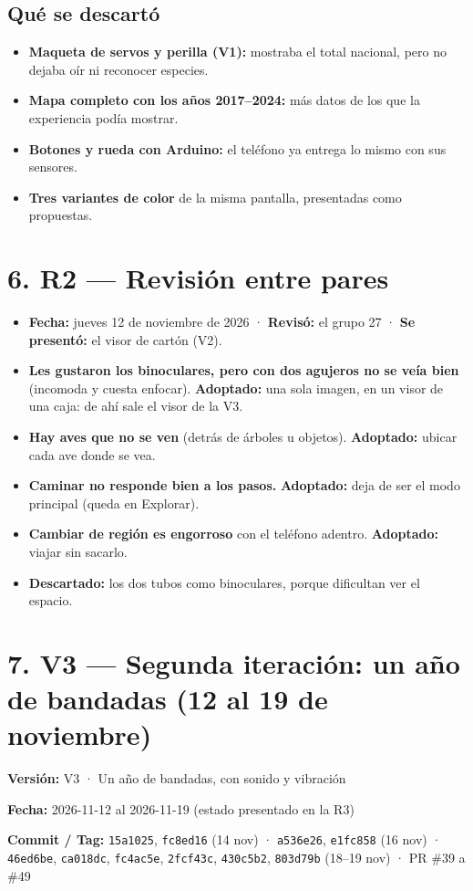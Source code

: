 \documentclass[11pt,a4paper]{article}
\newcommand{\seccion}[1]{\clearpage\section*{#1}}
\begin{document}
\subsection*{Qué se descartó}
\begin{itemize}
\item \textbf{Maqueta de servos y perilla (V1):} mostraba el total nacional, pero no dejaba oír ni reconocer especies.
\item \textbf{Mapa completo con los años 2017--2024:} más datos de los que la experiencia podía mostrar.
\item \textbf{Botones y rueda con Arduino:} el teléfono ya entrega lo mismo con sus sensores.
\item \textbf{Tres variantes de color} de la misma pantalla, presentadas como propuestas.
\end{itemize}
\section*{6. R2 --- Revisión entre pares}
\begin{itemize}
\item \textbf{Fecha:} jueves 12 de noviembre de 2026 · \textbf{Revisó:} el grupo 27 · \textbf{Se presentó:} el visor de cartón (V2).
\item \textbf{Les gustaron los binoculares, pero con dos agujeros no se veía bien} (incomoda y cuesta enfocar). \textbf{Adoptado:} una sola imagen, en un visor de una caja: de ahí sale el visor de la V3.
\item \textbf{Hay aves que no se ven} (detrás de árboles u objetos). \textbf{Adoptado:} ubicar cada ave donde se vea.
\item \textbf{Caminar no responde bien a los pasos.} \textbf{Adoptado:} deja de ser el modo principal (queda en Explorar).
\item \textbf{Cambiar de región es engorroso} con el teléfono adentro. \textbf{Adoptado:} viajar sin sacarlo.
\item \textbf{Descartado:} los dos tubos como binoculares, porque dificultan ver el espacio.
\end{itemize}
\seccion{7. V3 --- Segunda iteración: un año de bandadas (12 al 19 de noviembre)}
\textbf{Versión:} V3 · Un año de bandadas, con sonido y vibración\par
\textbf{Fecha:} 2026-11-12 al 2026-11-19 (estado presentado en la R3)\par
\textbf{Commit / Tag:} \texttt{15a1025}, \texttt{fc8ed16} (14 nov) · \texttt{a536e26}, \texttt{e1fc858} (16 nov) · \texttt{46ed6be}, \texttt{ca018dc}, \texttt{fc4ac5e}, \texttt{2fcf43c}, \texttt{430c5b2}, \texttt{803d79b} (18--19 nov) · PR \#39 a \#49\par
\end{document}
